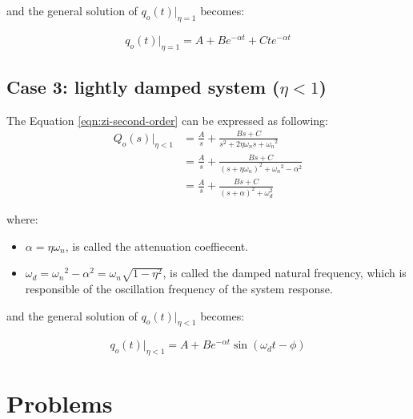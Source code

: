 \documentclass[a4paper,11pt,dvipsnames]{book}
\begin{document}
and the general solution of $q_o(t)|_{\eta=1}$ becomes:

\begin{equation}
q_o(t)|_{\eta=1} = A + Be^{-\alpha t}+Cte^{-\alpha t}
\end{equation}

\subsection*{Case 3: lightly damped system ($\eta < 1$)}

The Equation \ref{eqn:zi-second-order} can be expressed as following:
\begin{align*}
Q_o(s)|_{\eta<1} &= \frac{A}{s} + \frac{Bs + C}{s^2 + 2 \eta \omega_n s + {\omega_n}^2} \\
&= \frac{A}{s} + \frac{Bs+C}{(s+\eta \omega_n)^2 + {\omega_n}^2 - \alpha^2} \\
&= \frac{A}{s} + \frac{Bs+C}{(s+\alpha)^2 + \omega_d^2}
\end{align*}

where: 
\begin{itemize}
\item $\alpha=\eta \omega_n$, is called the attenuation coeffiecent.
\item $\omega_d= {\omega_n}^2 - \alpha^2 = \omega_n \sqrt{1-\eta^2}$, is called the damped natural frequency, which is responsible of the oscillation frequency of the system response.
\end{itemize}

and the general solution of $q_o(t)|_{\eta<1}$ becomes:

\begin{equation}
q_o(t)|_{\eta<1} = A + Be^{- \alpha t}\sin(\omega_d t - \phi)
\end{equation}

\section*{Problems}
\end{document}

